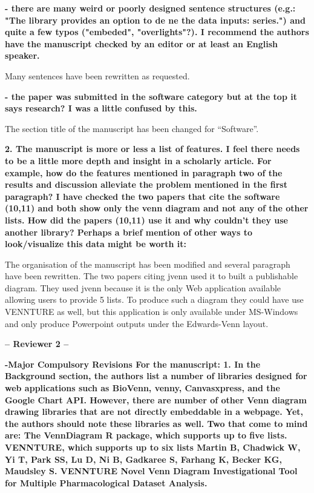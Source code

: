 \documentclass[10pt,stdletter,dateno,sigleft]{newlfm} %
\begin{document}
\begin{newlfm}
\textbf{- there are many weird or poorly designed sentence structures (e.g.:
"The library provides an option to de ne the data inputs: series.") and quite a 
few typos ("embeded", "overlights"?). I recommend the authors have the manuscript
checked by an editor or at least an English speaker.}

Many sentences have been rewritten as requested. 

\textbf{- the paper was submitted in the software category but at the top it
says research? I was a little confused by this.}

The section title of the manuscript has been changed for ``Software''.

\textbf{2. The manuscript is more or less a list of features. I feel there needs
to be a little more depth and insight in a scholarly article. For example, how
do  the features mentioned in paragraph two of the results and discussion
alleviate  the problem mentioned in the first paragraph? I have checked the two
papers  that cite the software (10,11) and both show only the venn diagram and
not  any of the other lists. How did the papers (10,11) use it and why couldn't 
they use another library? Perhaps a brief mention of other ways to
look/visualize this data might be worth it:}

The organisation of the manuscript has been modified and several paragraph have
been rewritten. 
The two papers citing jvenn used it to built a publishable diagram. They used
jvenn because it is the only Web application available allowing users to provide
5 lists. To produce such a diagram they could have use VENNTURE as well, but
this application is only available under MS-Windows and only produce Powerpoint
outputs under the Edwards-Venn layout.

\textbf{-- Reviewer 2 --}

\textbf{ -Major Compulsory Revisions
For the manuscript:
1. In the Background section, the authors list a number of libraries designed
for web applications such as BioVenn, venny, Canvasxpress, and the Google Chart 
API. However, there are number of other Venn diagram drawing libraries that are 
not directly embeddable in a webpage. Yet, the authors should note these
libraries as well. Two that come to mind are: The VennDiagram R package, which 
supports up to five lists. VENNTURE, which supports up to six lists Martin B, 
Chadwick W, Yi T, Park SS, Lu D, Ni B, Gadkaree S, Farhang K, Becker KG,
Maudsley  S. VENNTURE Novel Venn Diagram Investigational Tool for Multiple 
Pharmacological Dataset Analysis.}


\end{newlfm}
\end{document}
